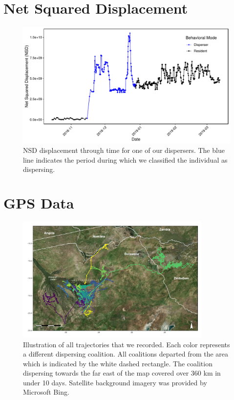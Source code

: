 \documentclass[abstract=off,10pt,a4paper,bibliography=totocnumbered]{article}
\begin{document}
\section{Net Squared Displacement}
\begin{figure}[hbpt]
  \begin{center}
    \includegraphics[width = \textwidth]{99_NSD.pdf}
    \caption{NSD displacement through time for one of our dispersers. The blue
    line indicates the period during which we classified the individual as
    dispersing.}
    \label{NSD}
  \end{center}
\end{figure}

\newpage
\section{GPS Data}
\begin{figure}[hbtp]
  \begin{center}
    \includegraphics[width = 0.86\textwidth]{99_Trajectories.pdf}
    \caption{Illustration of all trajectories that we recorded. Each color
    represents a different dispersing coalition. All coalitions departed from
    the area which is indicated by the white dashed rectangle. The coalition
    dispersing towards the far east of the map covered over 360 km in under 10
    days. Satellite background imagery was provided by Microsoft Bing.}
    \label{Trajectories}
  \end{center}
\end{figure}
\end{document}
